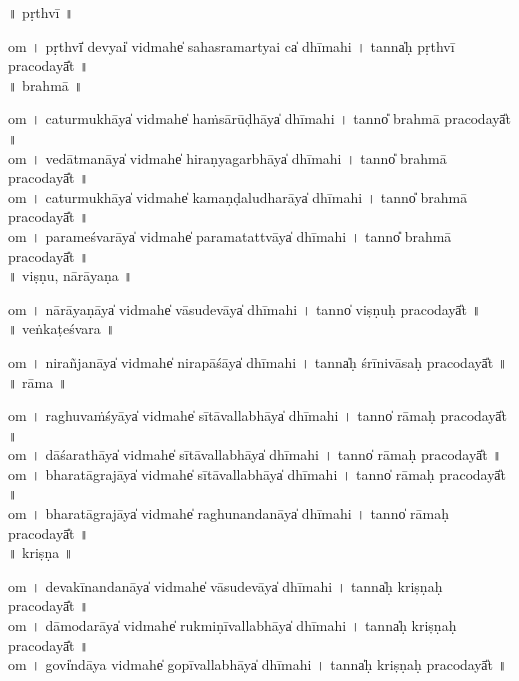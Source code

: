 \documentclass[parskip, DIV=14]{scrartcl}
\begin{document}
\vspace{0.201cm} ॥   pṛthvī  ॥ \par
  om  । pṛthvī̍ devyai̍ vi॒dmahe̍ sahasrama॒rtyai ca̍ dhīmahi  ।  tanna̍ḥ pṛthvī praco॒dayā̎t ॥ \\

\vspace{0.201cm} ॥   brahmā  ॥ \par
  om  । ca॒tu॒rmu॒khāya̍ vi॒dmahe̍ haṁsārū॒ḍhāya̍ dhīmahi  ।  tanno̎ brahmā praco॒dayā̎t ॥ \\
  om  । ve॒dā॒tma॒nāya̍ vi॒dmahe̍ hiraṇyaga॒rbhāya̍ dhīmahi  ।  tanno̎ brahmā praco॒dayā̎t ॥ \\
  om  । ca॒tu॒rmu॒khāya̍ vi॒dmahe̍ kamaṇḍaludha॒rāya̍ dhīmahi  ।  tanno̎ brahmā praco॒dayā̎t ॥ \\
  om  । pa॒ra॒me॒śva॒rāya̍ vi॒dmahe̍ paramata॒ttvāya̍ dhīmahi  ।  tanno̎ brahmā praco॒dayā̎t ॥ \\

\vspace{0.201cm} ॥   viṣṇu, nārāyaṇa  ॥ \par
  om  । nā॒rā॒ya॒ṇāya̍ vi॒dmahe̍ vāsude॒vāya̍ dhīmahi  ।  tanno̍ viṣṇuḥ praco॒dayā̎t ॥ \\

\vspace{0.201cm} ॥   veṅkaṭeśvara  ॥ \par
  om  । ni॒ra॒ñja॒nāya̍ vi॒dmahe̍ nirapā॒śāya̍  dhīmahi  ।  tanna̍ḥ śrīnivāsaḥ praco॒dayā̎t ॥ \\

\vspace{0.201cm} ॥   rāma  ॥ \par
  om  । ra॒ghu॒va॒ṁśyāya̍ vi॒dmahe̍ sītāvalla॒bhāya̍ dhīmahi  ।  tanno̍ rāmaḥ praco॒dayā̎t ॥ \\
  om  । dā॒śa॒ra॒thāya̍ vi॒dmahe̍ sītāvalla॒bhāya̍ dhīmahi  ।  tanno̍ rāmaḥ praco॒dayā̎t ॥ \\
  om  । bha॒ra॒tā॒gra॒jāya̍ vi॒dmahe̍ sītāvalla॒bhāya̍ dhīmahi  ।  tanno̍ rāmaḥ praco॒dayā̎t ॥ \\
  om  । bha॒ra॒tā॒gra॒jāya̍ vi॒dmahe̍ raghunanda॒nāya̍ dhīmahi  ।  tanno̍ rāmaḥ praco॒dayā̎t ॥ \\

\vspace{0.201cm} ॥   kriṣṇa  ॥ \par
  om  । de॒va॒kī॒na॒nda॒nāya̍ vi॒dmahe̍ vāsude॒vāya̍ dhīmahi  ।  tanna̍ḥ kriṣṇaḥ praco॒dayā̎t ॥ \\
  om  । dā॒mo॒da॒rāya̍ vi॒dmahe̍ rukmiṇīvalla॒bhāya̍ dhīmahi  ।  tanna̍ḥ kriṣṇaḥ praco॒dayā̎t ॥ \\
  om  । govi̍ndāya vi॒dmahe̍ gopīvalla॒bhāya̍ dhīmahi  ।  tanna̍ḥ kriṣṇaḥ praco॒dayā̎t ॥ \\
\end{document}
